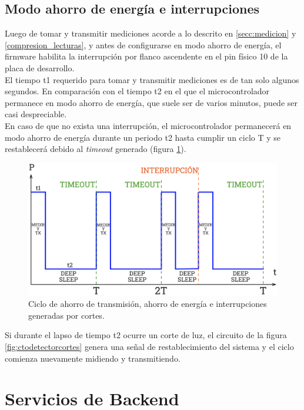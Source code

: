 \subsection{Modo ahorro de energía e interrupciones}
Luego de tomar y transmitir mediciones acorde a lo descrito en \ref{secc:medicion} y \ref{compresion_lecturas}, y antes de configurarse en modo ahorro de energía, el firmware habilita la interrupción por flanco ascendente en el pin físico 10 de la placa de desarrollo.\\
El tiempo t1 requerido para tomar y transmitir mediciones es de tan solo algunos segundos. En comparación con el tiempo t2 en el que el microcontrolador permanece en modo ahorro de energía, que suele ser de varios minutos, puede ser casi despreciable.\\ 
En caso de que no exista una interrupción, el microcontrolador permanecerá en modo ahorro de energía durante un periodo t2 hasta cumplir un ciclo T y se restablecerá debido al \textit{timeout} generado (figura \ref{fig:ciclodeepsleep}).\\
\begin{figure}
	\centering
	\includegraphics[width=1.0\linewidth]{Figures/ciclodeepsleep}
	\caption{Ciclo de ahorro de transmisión, ahorro de energía e interrupciones generadas por cortes.}
	\label{fig:ciclodeepsleep}
\end{figure}
Si durante el lapso de tiempo t2 ocurre un corte de luz, el circuito de la figura \ref{fig:ctodetectorcortes} genera una señal de restablecimiento del sistema y el ciclo comienza nuevamente midiendo y transmitiendo.\\


\section{Servicios de Backend}
\label{seccion_bes}

